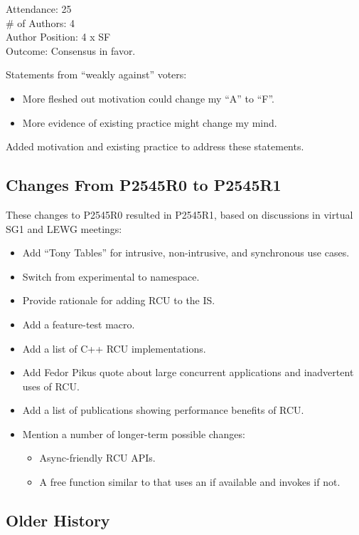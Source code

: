 Attendance: 25 \\
\# of Authors: 4 \\
Author Position: 4 x SF \\
Outcome: Consensus in favor.

Statements from ``weakly against'' voters:

\begin{itemize}
\item	More fleshed out motivation could change my ``A'' to ``F''.
\item	More evidence of existing practice might change my mind.
\end{itemize}

Added motivation and existing practice to address these statements.

\subsection{Changes From P2545R0 to P2545R1}
\label{sec:Changes From P2545R0 to P2545R1}

These changes to P2545R0 resulted in P2545R1, based on discussions
in virtual SG1 and LEWG meetings:

\begin{itemize}
\item	Add ``Tony Tables'' for intrusive, non-intrusive, and
	synchronous use cases.
\item	Switch from experimental to  namespace.
\item	Provide rationale for adding RCU to the IS.
\item	Add a feature-test macro.
\item	Add a list of C++ RCU implementations.
\item	Add Fedor Pikus quote about large concurrent applications
	and inadvertent uses of RCU.
\item	Add a list of publications showing performance benefits of RCU.
\item	Mention a number of longer-term possible changes:
	\begin{itemize}
	\item	Async-friendly RCU APIs.
	\item	A free function similar to  that
		uses an  if available and invokes
		 if not.
	\end{itemize}
\end{itemize}

\subsection{Older History}
\label{sec:Older History}

